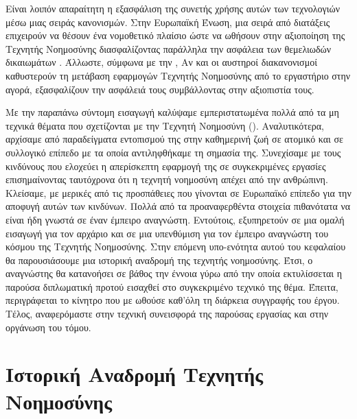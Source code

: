 Είναι λοιπόν απαραίτητη η εξασφάλιση της συνετής χρήσης αυτών των τεχνολογιών μέσω μιας σειράς κανονισμών. Στην Ευρωπαϊκή Ένωση, μια σειρά από διατάξεις επιχειρούν να θέσουν ένα νομοθετικό πλαίσιο ώστε να ωθήσουν στην αξιοποίηση της Τεχνητής Νοημοσύνης διασφαλίζοντας παράλληλα την ασφάλεια των θεμελιωδών δικαιωμάτων \cite{europeancomissionai2021}. Άλλωστε, σύμφωνα με την  \cite{VonderLeyen2019},  Αν και οι αυστηροί διακανονισμοί καθυστερούν τη μετάβαση εφαρμογών Τεχνητής Νοημοσύνης από το εργαστήριο στην αγορά, εξασφαλίζουν την ασφάλειά τους συμβάλλοντας στην αξιοπιστία τους.
\par

Με την παραπάνω σύντομη εισαγωγή καλύψαμε εμπεριστατωμένα πολλά από τα μη τεχνικά θέματα που σχετίζονται με την Τεχνητή Νοημοσύνη ().
Αναλυτικότερα, αρχίσαμε από παραδείγματα εντοπισμού της στην καθημερινή ζωή σε ατομικό και σε συλλογικό επίπεδο με τα οποία αντιληφθήκαμε τη σημασία της. Συνεχίσαμε με τους κινδύνους που ελοχεύει η απερίσκεπτη εφαρμογή της σε συγκεκριμένες εργασίες επισημαίνοντας ταυτόχρονα ότι η τεχνητή νοημοσύνη απέχει από την ανθρώπινη. Κλείσαμε, με μερικές από τις προσπάθειες που γίνονται σε Ευρωπαϊκό επίπεδο για την αποφυγή αυτών των κινδύνων.
Πολλά από τα προαναφερθέντα στοιχεία πιθανότατα να είναι ήδη γνωστά σε έναν έμπειρο αναγνώστη. Εντούτοις, εξυπηρετούν σε μια ομαλή εισαγωγή για τον αρχάριο και σε μια υπενθύμιση για τον έμπειρο αναγνώστη του κόσμου της Τεχνητής Νοημοσύνης.
Στην επόμενη υπο-ενότητα αυτού του κεφαλαίου θα παρουσιάσουμε μια ιστορική αναδρομή της τεχνητής νοημοσύνης. Έτσι, ο αναγνώστης θα κατανοήσει σε βάθος την έννοια γύρω από την οποία εκτυλίσσεται η παρούσα διπλωματική προτού εισαχθεί στο συγκεκριμένο τεχνικό της θέμα. Έπειτα, περιγράφεται το κίνητρο που με ωθούσε καθ'όλη τη διάρκεια συγγραφής του έργου. Τέλος, αναφερόμαστε στην τεχνική συνεισφορά της παρούσας εργασίας και στην οργάνωση του τόμου.



\section[Ιστορική Αναδρομή Τεχνιτής Νοημοσύνης]{Ιστορική Αναδρομή Τεχνητής Νοημοσύνης}

